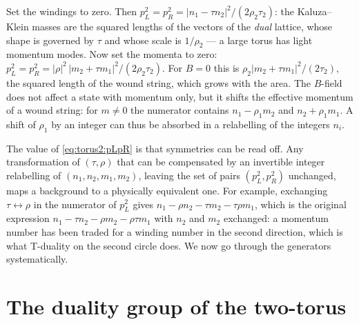 \begin{physicsbox}
Set the windings to zero. Then $p_L^2=p_R^2=|n_1-\tau n_2|^2/(2\rho_2\tau_2)$: the
Kaluza--Klein masses are the squared lengths of the vectors of the \emph{dual} lattice,
whose shape is governed by $\tau$ and whose scale is $1/\rho_2$ --- a large torus has light
momentum modes. Now set the momenta to zero: $p_L^2=p_R^2=|\rho|^2\,|m_2+\tau m_1|^2/(2\rho_2\tau_2)$.
For $B=0$ this is $\rho_2|m_2+\tau m_1|^2/(2\tau_2)$, the squared length of the wound
string, which grows with the area. The $B$-field does not affect a state with momentum
only, but it shifts the effective momentum of a wound string: for $m\neq0$ the numerator
contains $n_1-\rho_1m_2$ and $n_2+\rho_1m_1$. A shift of $\rho_1$ by an integer can thus
be absorbed in a relabelling of the integers $n_i$.
\end{physicsbox}

The value of \eqref{eq:torus2:pLpR} is that symmetries can be read off. Any transformation
of $(\tau,\rho)$ that can be compensated by an invertible integer relabelling of
$(n_1,n_2,m_1,m_2)$, leaving the set of pairs $(p_L^2,p_R^2)$ unchanged, maps a background to
a physically equivalent one. For example, exchanging $\tau\leftrightarrow\rho$ in the
numerator of $p_L^2$ gives $n_1-\rho n_2-\tau m_2-\tau\rho m_1$, which is the original
expression $n_1-\tau n_2-\rho m_2-\rho\tau m_1$ with $n_2$ and $m_2$ exchanged: a momentum
number has been traded for a winding number in the second direction, which is what
T-duality on the second circle does. We now go through the generators systematically.

\section{The duality group of the two-torus}\label{sec:torus2:group}

